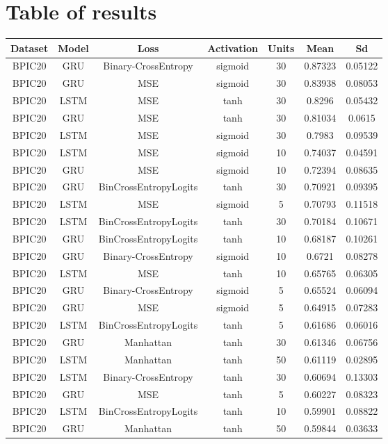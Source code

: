\documentclass{article}%
\begin{document}
%
\normalsize%
\section{Table of results}%
\label{sec:Tableofresults}%
\begin{longtable}{|c|c|c|c|c|c|c|}%
\hline%
\rowcolor{lightgray!70}%
\textbf{Dataset}&\textbf{Model}&\textbf{Loss}&\textbf{Activation}&\textbf{Units}&\textbf{Mean}&\textbf{Sd}\\%
\hline%
BPIC20&GRU&Binary{-}CrossEntropy&sigmoid&30&0.87323&0.05122\\%
\hline%
BPIC20&GRU&MSE&sigmoid&30&0.83938&0.08053\\%
\hline%
BPIC20&LSTM&MSE&tanh&30&0.8296&0.05432\\%
\hline%
BPIC20&GRU&MSE&tanh&30&0.81034&0.0615\\%
\hline%
BPIC20&LSTM&MSE&sigmoid&30&0.7983&0.09539\\%
\hline%
BPIC20&LSTM&MSE&sigmoid&10&0.74037&0.04591\\%
\hline%
BPIC20&GRU&MSE&sigmoid&10&0.72394&0.08635\\%
\hline%
BPIC20&GRU&BinCrossEntropyLogits&tanh&30&0.70921&0.09395\\%
\hline%
BPIC20&LSTM&MSE&sigmoid&5&0.70793&0.11518\\%
\hline%
BPIC20&LSTM&BinCrossEntropyLogits&tanh&30&0.70184&0.10671\\%
\hline%
BPIC20&GRU&BinCrossEntropyLogits&tanh&10&0.68187&0.10261\\%
\hline%
BPIC20&GRU&Binary{-}CrossEntropy&sigmoid&10&0.6721&0.08278\\%
\hline%
BPIC20&LSTM&MSE&tanh&10&0.65765&0.06305\\%
\hline%
BPIC20&GRU&Binary{-}CrossEntropy&sigmoid&5&0.65524&0.06094\\%
\hline%
BPIC20&GRU&MSE&sigmoid&5&0.64915&0.07283\\%
\hline%
BPIC20&LSTM&BinCrossEntropyLogits&tanh&5&0.61686&0.06016\\%
\hline%
BPIC20&GRU&Manhattan&tanh&30&0.61346&0.06756\\%
\hline%
BPIC20&LSTM&Manhattan&tanh&50&0.61119&0.02895\\%
\hline%
BPIC20&LSTM&Binary{-}CrossEntropy&tanh&30&0.60694&0.13303\\%
\hline%
BPIC20&GRU&MSE&tanh&5&0.60227&0.08323\\%
\hline%
BPIC20&LSTM&BinCrossEntropyLogits&tanh&10&0.59901&0.08822\\%
\hline%
BPIC20&GRU&Manhattan&tanh&50&0.59844&0.03633\\%

\end{longtable}
\end{document}
